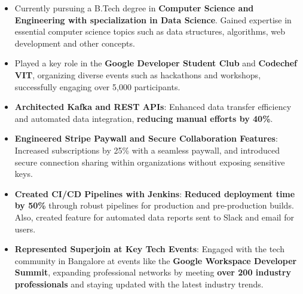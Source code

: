 \documentclass[10pt,a4paper,ragged2e,withhyper]{altacv}
\begin{document}
\begin{paracol}{2}


\begin{itemize}
\item Currently pursuing a B.Tech degree in \textbf{Computer Science and Engineering with specialization in Data Science}. Gained expertise in essential computer science topics such as data structures, algorithms, web development and other concepts.
\item Played a key role in the \textbf{Google Developer Student Club} and \textbf{Codechef VIT}, organizing diverse events such as hackathons and workshops, successfully engaging over 5,000 participants.
\end{itemize}


\begin{itemize}

\item \textbf{Architected Kafka and REST APIs}: Enhanced data transfer efficiency and automated data integration, \textbf{reducing manual efforts by 40\%}.

\item \textbf{Engineered Stripe Paywall and Secure Collaboration Features}: Increased subscriptions by 25\% with a seamless paywall, and introduced secure connection sharing within organizations without exposing sensitive keys.

\item \textbf{Created CI/CD Pipelines with Jenkins}: \textbf{Reduced deployment time by 50\%} through robust pipelines for production and pre-production builds. Also, created feature for automated data reports sent to Slack and email for users.

\item \textbf{Represented Superjoin at Key Tech Events}: Engaged with the tech community in Bangalore at events like the \textbf{Google Workspace Developer Summit}, expanding professional networks by meeting \textbf{over 200 industry professionals} and staying updated with the latest industry trends.
\end{itemize}

\divider


\end{paracol}
\end{document}
